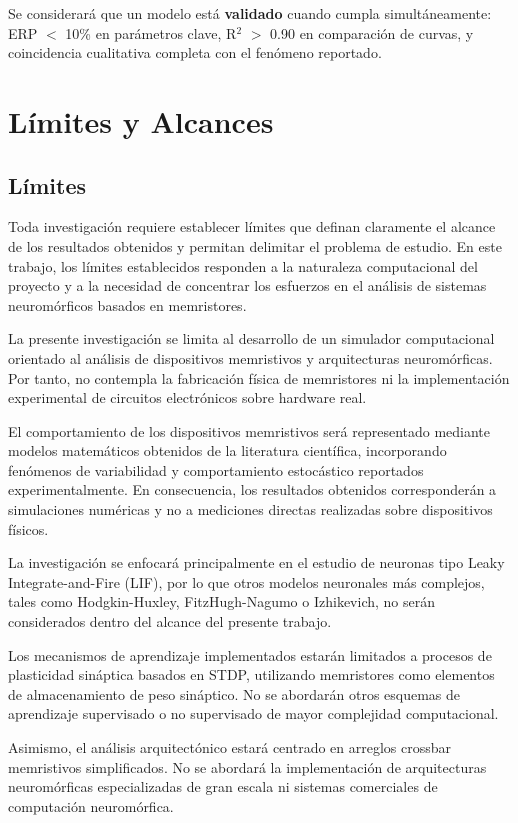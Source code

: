 Se considerará que un modelo está \textbf{validado} cuando cumpla simultáneamente: ERP $<$ 10\% en parámetros clave, R$^2$ $>$ 0.90 en comparación de curvas, y coincidencia cualitativa completa con el fenómeno reportado.

\section{Límites y Alcances}

\subsection{Límites}

Toda investigación requiere establecer límites que definan claramente el alcance de los resultados obtenidos y permitan delimitar el problema de estudio. En este trabajo, los límites establecidos responden a la naturaleza computacional del proyecto y a la necesidad de concentrar los esfuerzos en el análisis de sistemas neuromórficos basados en memristores.

La presente investigación se limita al desarrollo de un simulador computacional orientado al análisis de dispositivos memristivos y arquitecturas neuromórficas. Por tanto, no contempla la fabricación física de memristores ni la implementación experimental de circuitos electrónicos sobre hardware real.

El comportamiento de los dispositivos memristivos será representado mediante modelos matemáticos obtenidos de la literatura científica, incorporando fenómenos de variabilidad y comportamiento estocástico reportados experimentalmente. En consecuencia, los resultados obtenidos corresponderán a simulaciones numéricas y no a mediciones directas realizadas sobre dispositivos físicos.

La investigación se enfocará principalmente en el estudio de neuronas tipo Leaky Integrate-and-Fire (LIF), por lo que otros modelos neuronales más complejos, tales como Hodgkin-Huxley, FitzHugh-Nagumo o Izhikevich, no serán considerados dentro del alcance del presente trabajo.

Los mecanismos de aprendizaje implementados estarán limitados a procesos de plasticidad sináptica basados en STDP, utilizando memristores como elementos de almacenamiento de peso sináptico. No se abordarán otros esquemas de aprendizaje supervisado o no supervisado de mayor complejidad computacional.

Asimismo, el análisis arquitectónico estará centrado en arreglos crossbar memristivos simplificados. No se abordará la implementación de arquitecturas neuromórficas especializadas de gran escala ni sistemas comerciales de computación neuromórfica.

